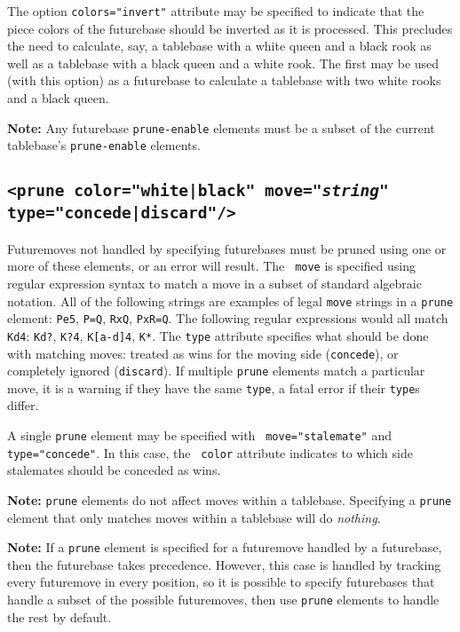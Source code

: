 \documentclass[11pt]{article}
\begin{document}
The option {\tt colors="invert"} attribute may be specified to indicate
that the piece colors of the futurebase should be inverted as it is
processed.  This precludes the need to calculate, say, a tablebase
with a white queen and a black rook as well as a tablebase with a
black queen and a white rook.  The first may be used (with this
option) as a futurebase to calculate a tablebase with two white rooks
and a black queen.

{\bf Note:} Any futurebase {\tt prune-enable} elements must be a subset of
the current tablebase's {\tt prune-enable} elements.

\subsection{\tt <prune color="white|black" move="{\it string}" type="concede|discard"/>}

Futuremoves not handled by specifying futurebases must be pruned using
one or more of these elements, or an error will result.  The {\tt
  move} is specified using regular expression syntax to match a move
in a subset of standard algebraic notation.  All of the following
strings are examples of legal {\tt move} strings in a {\tt prune}
element: {\tt Pe5}, {\tt P=Q}, {\tt RxQ}, {\tt PxR=Q}.  The following
regular expressions would all match {\tt Kd4}: {\tt Kd?}, {\tt K?4},
{\tt K[a-d]4}, {\tt K*}.  The {\tt type} attribute specifies what
should be done with matching moves: treated as wins for the moving
side ({\tt concede}), or completely ignored ({\tt discard}).  If
multiple {\tt prune} elements match a particular move, it is a warning
if they have the same {\tt type}, a fatal error if their {\tt type}s
differ.

A single {\tt prune} element may be specified with {\tt
move="stalemate"} and {\tt type="concede"}.  In this case, the {\tt
color} attribute indicates to which side stalemates should be conceded
as wins.

{\bf Note:} {\tt prune} elements do not affect moves within a
tablebase.  Specifying a {\tt prune} element that only matches
moves within a tablebase will do {\it nothing}.

{\bf Note:} If a {\tt prune} element is specified for a futuremove
handled by a futurebase, then the futurebase takes precedence.
However, this case is handled by tracking every futuremove in every
position, so it is possible to specify futurebases that handle a
subset of the possible futuremoves, then use {\tt prune} elements to
handle the rest by default.
\end{document}
